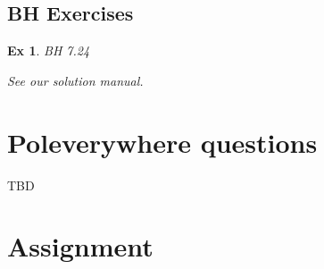 \documentclass[a4paper,11pt]{article}
\newtheorem{exercise}[theorem]{Ex}
\begin{document}
\subsection{BH Exercises}
\label{sec:bh-exercises-1}


\begin{exercise}
BH 7.24
\begin{solution}
See our solution manual.
\end{solution}
\end{exercise}



\section{Poleverywhere questions}
\label{sec:polev-quest}


TBD


\section{Assignment}
\label{sec:assignment}

%



\end{document}
